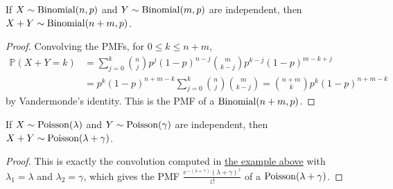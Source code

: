   \begin{theorem}
    \label{thm:sum-of-independent-binomials-is-binomial}
    If $X \sim \operatorname{Binomial}(n, p)$ and $Y \sim \operatorname{Binomial}(m, p)$ are independent, then $X + Y \sim \operatorname{Binomial}(n + m, p)$. 
  \end{theorem}
  \begin{proof}
    Convolving the PMFs, for $0 \leq k \leq n + m$, 
    \begin{align*}
      \mathbb{P}(X + Y = k) & = \sum_{j=0}^{k} \binom{n}{j} p^j (1 - p)^{n - j} \binom{m}{k - j} p^{k - j} (1 - p)^{m - k + j} \\
      & = p^k (1 - p)^{n + m - k} \sum_{j=0}^k \binom{n}{j} \binom{m}{k - j} = \binom{n + m}{k} p^k (1 - p)^{n + m - k}
    \end{align*}
    by Vandermonde's identity. This is the PMF of a $\operatorname{Binomial}(n + m, p)$. 
  \end{proof}

  \begin{theorem}
    \label{thm:sum-of-independent-poissons-is-poisson}
    If $X \sim \operatorname{Poisson}(\lambda)$ and $Y \sim \operatorname{Poisson}(\gamma)$ are independent, then $X + Y \sim \operatorname{Poisson}(\lambda + \gamma)$. 
  \end{theorem}
  \begin{proof}
    This is exactly the convolution computed in \hyperref[ex:sums-of-poisson-rvs]{the example above} with $\lambda_1 = \lambda$ and $\lambda_2 = \gamma$, which gives the PMF $\frac{e^{-(\lambda + \gamma)} (\lambda + \gamma)^z}{z!}$ of a $\operatorname{Poisson}(\lambda + \gamma)$. 
  \end{proof}

